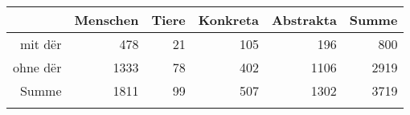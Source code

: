 \begin{tabular}{rrrrrr}
  \lsptoprule
 & Menschen & Tiere & Konkreta & Abstrakta & Summe \\ 
  \midrule
mit dër & 478 & 21 & 105 & 196 & 800 \\ 
  ohne dër & 1333 & 78 & 402 & 1106 & 2919 \\ 
  Summe & 1811 & 99 & 507 & 1302 & 3719 \\ 
   \lspbottomrule
\end{tabular}
